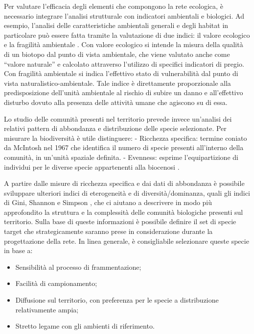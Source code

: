 \documentclass[
]{book}
\begin{document}
Per valutare l'efficacia degli elementi che compongono la rete
ecologica, è necessario integrare l'analisi strutturale con indicatori
ambientali e biologici. Ad esempio, l'analisi delle caratteristiche
ambientali generali e degli habitat in particolare può essere fatta
tramite la valutazione di due indici: il valore ecologico e la fragilità
ambientale \citep{angeliniProgettoCartaNatura2009}. Con valore ecologico si
intende la misura della qualità di un biotopo dal punto di vista
ambientale, che viene valutato anche come ``valore naturale'' e calcolato
attraverso l'utilizzo di specifici indicatori di pregio. Con fragilità
ambientale si indica l'effettivo stato di vulnerabilità dal punto di
vista naturalistico-ambientale. Tale indice è direttamente proporzionale
alla predisposizione dell'unità ambientale al rischio di subire un danno
e all'effettivo disturbo dovuto alla presenza delle attività umane che
agiscono su di essa.

Lo studio delle comunità presenti nel territorio prevede invece
un'analisi dei relativi pattern di abbondanza e distribuzione delle
specie selezionate. Per misurare la biodiversità è utile distinguere: -
Ricchezza specifica: termine coniato da McIntosh nel 1967 che identifica
il numero di specie presenti all'interno della comunità, in un'unità
spaziale definita. - Evenness: esprime l'equipartizione di individui per
le diverse specie appartenenti alla biocenosi
\citep{magurranMeasuringBiologicalDiversity2004, magurranMeasuringSpeciesDiversity2011}.

A partire dalle misure di ricchezza specifica e dai dati di abbondanza è
possibile sviluppare ulteriori indici di eterogeneità e di
diversità/dominanza, quali gli indici di Gini, Shannon e Simpson
\citep{magurranMeasuringBiologicalDiversity2004}, che ci aiutano a descrivere
in modo più approfondito la struttura e la complessità delle comunità
biologiche presenti sul territorio. Sulla base di queste informazioni è
possibile definire il set di specie target che strategicamente saranno
prese in considerazione durante la progettazione della rete. In linea
generale, è consigliabile selezionare queste specie in base a:

\begin{itemize}
\item
  Sensibilità al processo di frammentazione;
\item
  Facilità di campionamento;
\item
  Diffusione sul territorio, con preferenza per le specie a
  distribuzione relativamente ampia;
\item
  Stretto legame con gli ambienti di riferimento.
\end{itemize}
\end{document}
